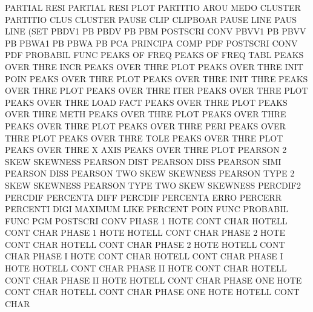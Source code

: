 PARTIAL  RESI                           PARTIAL  RESI PLOT
PARTITIO AROU MEDO                      CLUSTER
PARTITIO CLUS                           CLUSTER
PAUSE    CLIP                           CLIPBOAR
PAUSE    LINE                           PAUS     LINE (SET
PBDV1                                   PB
PBDV                                    PB
PBM                                     POSTSCRI CONV
PBVV1                                   PB
PBVV                                    PB
PBWA1                                   PB
PBWA                                    PB
PCA                                     PRINCIPA COMP
PDF                                     POSTSCRI CONV
PDF                                     PROBABIL FUNC
PEAKS    OF   FREQ                      PEAKS    OF   FREQ TABL
PEAKS    OVER THRE INCR                 PEAKS    OVER THRE PLOT
PEAKS    OVER THRE INIT POIN            PEAKS    OVER THRE PLOT
PEAKS    OVER THRE INIT THRE            PEAKS    OVER THRE PLOT
PEAKS    OVER THRE ITER                 PEAKS    OVER THRE PLOT
PEAKS    OVER THRE LOAD FACT            PEAKS    OVER THRE PLOT
PEAKS    OVER THRE METH                 PEAKS    OVER THRE PLOT
PEAKS    OVER THRE                      PEAKS    OVER THRE PLOT
PEAKS    OVER THRE PERI                 PEAKS    OVER THRE PLOT
PEAKS    OVER THRE TOLE                 PEAKS    OVER THRE PLOT
PEAKS    OVER THRE X    AXIS            PEAKS    OVER THRE PLOT
PEARSON  2    SKEW                      SKEWNESS
PEARSON  DIST                           PEARSON  DISS
PEARSON  SIMI                           PEARSON  DISS
PEARSON  TWO  SKEW                      SKEWNESS
PEARSON  TYPE 2    SKEW                 SKEWNESS
PEARSON  TYPE TWO  SKEW                 SKEWNESS
PERCDIF2                                PERCDIF
PERCENTA DIFF                           PERCDIF
PERCENTA ERRO                           PERCERR
PERCENTI DIGI                           MAXIMUM  LIKE
PERCENT  POIN FUNC                      PROBABIL FUNC
PGM                                     POSTSCRI CONV
PHASE    1    HOTE CONT CHAR            HOTELL   CONT CHAR
PHASE    1    HOTE                      HOTELL   CONT CHAR
PHASE    2    HOTE CONT CHAR            HOTELL   CONT CHAR
PHASE    2    HOTE                      HOTELL   CONT CHAR
PHASE    I    HOTE CONT CHAR            HOTELL   CONT CHAR
PHASE    I    HOTE                      HOTELL   CONT CHAR
PHASE    II   HOTE CONT CHAR            HOTELL   CONT CHAR
PHASE    II   HOTE                      HOTELL   CONT CHAR
PHASE    ONE  HOTE CONT CHAR            HOTELL   CONT CHAR
PHASE    ONE  HOTE                      HOTELL   CONT CHAR
